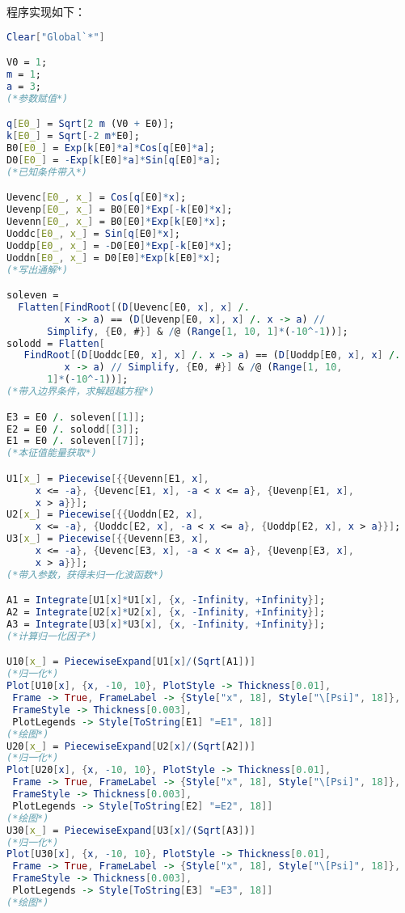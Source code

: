 \documentclass{article}
\begin{document}
程序实现如下：

\begin{lstlisting}[language=Mathematica]
Clear["Global`*"]

V0 = 1;
m = 1;
a = 3;
(*参数赋值*)

q[E0_] = Sqrt[2 m (V0 + E0)];
k[E0_] = Sqrt[-2 m*E0];
B0[E0_] = Exp[k[E0]*a]*Cos[q[E0]*a];
D0[E0_] = -Exp[k[E0]*a]*Sin[q[E0]*a];
(*已知条件带入*)

Uevenc[E0_, x_] = Cos[q[E0]*x];
Uevenp[E0_, x_] = B0[E0]*Exp[-k[E0]*x];
Uevenn[E0_, x_] = B0[E0]*Exp[k[E0]*x];
Uoddc[E0_, x_] = Sin[q[E0]*x];
Uoddp[E0_, x_] = -D0[E0]*Exp[-k[E0]*x];
Uoddn[E0_, x_] = D0[E0]*Exp[k[E0]*x];
(*写出通解*)

soleven = 
  Flatten[FindRoot[(D[Uevenc[E0, x], x] /. 
          x -> a) == (D[Uevenp[E0, x], x] /. x -> a) // 
       Simplify, {E0, #}] & /@ (Range[1, 10, 1]*(-10^-1))];
solodd = Flatten[
   FindRoot[(D[Uoddc[E0, x], x] /. x -> a) == (D[Uoddp[E0, x], x] /. 
          x -> a) // Simplify, {E0, #}] & /@ (Range[1, 10, 
       1]*(-10^-1))];
(*带入边界条件，求解超越方程*)

E3 = E0 /. soleven[[1]];
E2 = E0 /. solodd[[3]];
E1 = E0 /. soleven[[7]];
(*本征值能量获取*)

U1[x_] = Piecewise[{{Uevenn[E1, x], 
     x <= -a}, {Uevenc[E1, x], -a < x <= a}, {Uevenp[E1, x], 
     x > a}}];
U2[x_] = Piecewise[{{Uoddn[E2, x], 
     x <= -a}, {Uoddc[E2, x], -a < x <= a}, {Uoddp[E2, x], x > a}}];
U3[x_] = Piecewise[{{Uevenn[E3, x], 
     x <= -a}, {Uevenc[E3, x], -a < x <= a}, {Uevenp[E3, x], 
     x > a}}];
(*带入参数，获得未归一化波函数*)

A1 = Integrate[U1[x]*U1[x], {x, -Infinity, +Infinity}];
A2 = Integrate[U2[x]*U2[x], {x, -Infinity, +Infinity}];
A3 = Integrate[U3[x]*U3[x], {x, -Infinity, +Infinity}];
(*计算归一化因子*)

U10[x_] = PiecewiseExpand[U1[x]/(Sqrt[A1])]
(*归一化*)
Plot[U10[x], {x, -10, 10}, PlotStyle -> Thickness[0.01], 
 Frame -> True, FrameLabel -> {Style["x", 18], Style["\[Psi]", 18]}, 
 FrameStyle -> Thickness[0.003], 
 PlotLegends -> Style[ToString[E1] "=E1", 18]]
(*绘图*)
U20[x_] = PiecewiseExpand[U2[x]/(Sqrt[A2])]
(*归一化*)
Plot[U20[x], {x, -10, 10}, PlotStyle -> Thickness[0.01], 
 Frame -> True, FrameLabel -> {Style["x", 18], Style["\[Psi]", 18]}, 
 FrameStyle -> Thickness[0.003], 
 PlotLegends -> Style[ToString[E2] "=E2", 18]]
(*绘图*)
U30[x_] = PiecewiseExpand[U3[x]/(Sqrt[A3])]
(*归一化*)
Plot[U30[x], {x, -10, 10}, PlotStyle -> Thickness[0.01], 
 Frame -> True, FrameLabel -> {Style["x", 18], Style["\[Psi]", 18]}, 
 FrameStyle -> Thickness[0.003], 
 PlotLegends -> Style[ToString[E3] "=E3", 18]]
(*绘图*)
\end{lstlisting}
\end{document}
